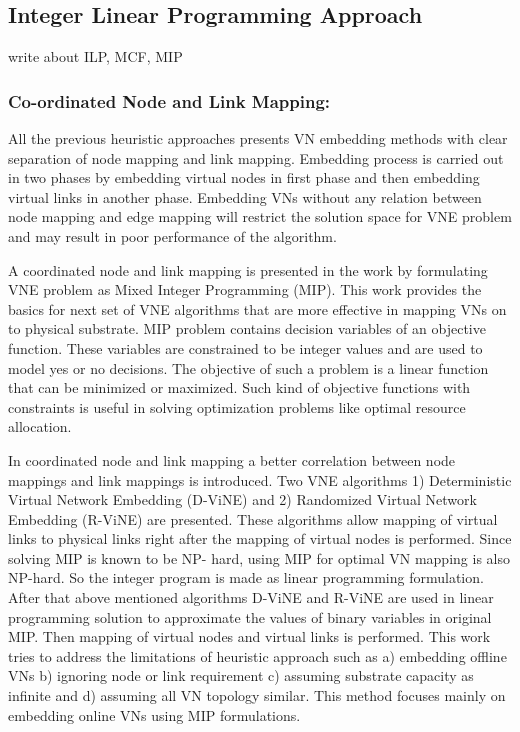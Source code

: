 \documentclass[article,dr=phil,type=msc ,colorback,accentcolor=tud4b]{tudthesis}
\begin{document}
\subsection{Integer Linear Programming Approach} 
write about ILP, MCF, MIP

\subsubsection{Co-ordinated Node and Link Mapping:}

All the previous heuristic approaches presents VN embedding methods with clear separation of node mapping and link mapping. Embedding process is carried out in two phases by embedding virtual nodes in first phase and then embedding virtual links in another phase. Embedding VNs without any relation between node mapping and edge mapping will restrict the solution space for VNE problem and may result in poor performance of the algorithm.  \newline

A coordinated node and link mapping is presented in the work \cite{coord_map} by formulating VNE problem as Mixed Integer Programming (MIP). This work provides the basics for next set of VNE algorithms that are more effective in mapping VNs on to physical substrate. MIP problem contains decision variables of an objective function. These variables are constrained to be integer values and are used to model yes or no decisions. The objective of such a problem is a linear function that can be minimized or maximized. Such kind of objective functions with constraints is useful in solving optimization problems like optimal resource allocation. \newline

In coordinated node and link mapping \cite{coord_map} a better correlation between node mappings and link mappings is introduced. Two VNE algorithms 1) Deterministic Virtual Network Embedding (D-ViNE) and 2) Randomized Virtual Network Embedding (R-ViNE) are presented. These algorithms allow mapping of virtual links to physical links right after the mapping of virtual nodes is performed. Since solving MIP is known to be NP- hard, using MIP for optimal VN mapping is also NP-hard. So the integer program is made as linear programming formulation.  After that above mentioned algorithms D-ViNE and R-ViNE are used in linear programming solution to approximate the values of binary variables in original MIP. Then mapping of virtual nodes and virtual links is performed. This work tries to address the limitations of heuristic approach such as a) embedding offline VNs b) ignoring node or link requirement c) assuming substrate capacity as infinite and d) assuming all VN topology similar.  This method focuses mainly on embedding online VNs using MIP formulations.\newline
\end{document}

